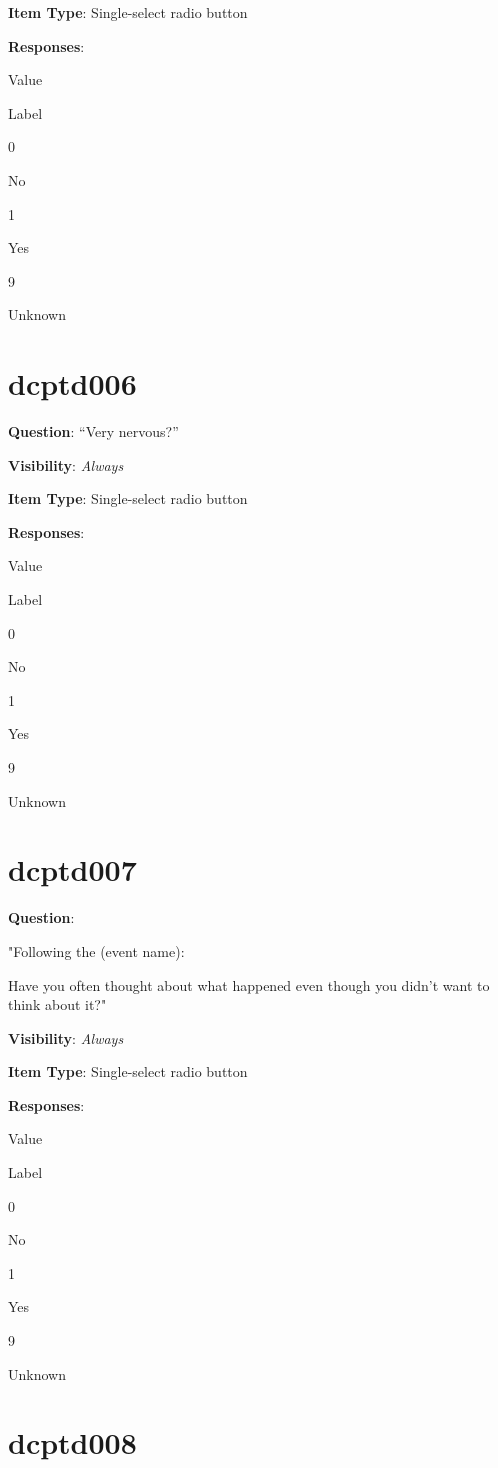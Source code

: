 \documentclass[]{book}
\begin{document}
\textbf{Item Type}: Single-select radio button

\textbf{Responses}:

Value

Label

0

No

1

Yes

9

Unknown

\hypertarget{dcptd006}{%
\section{dcptd006}\label{dcptd006}}

\textbf{Question}: ``Very nervous?''

\textbf{Visibility}: \emph{Always}

\textbf{Item Type}: Single-select radio button

\textbf{Responses}:

Value

Label

0

No

1

Yes

9

Unknown

\hypertarget{dcptd007}{%
\section{dcptd007}\label{dcptd007}}

\textbf{Question}:

"Following the (event name):

Have you often thought about what happened even though you didn't want to think about it?"

\textbf{Visibility}: \emph{Always}

\textbf{Item Type}: Single-select radio button

\textbf{Responses}:

Value

Label

0

No

1

Yes

9

Unknown

\hypertarget{dcptd008}{%
\section{dcptd008}\label{dcptd008}}
\end{document}

